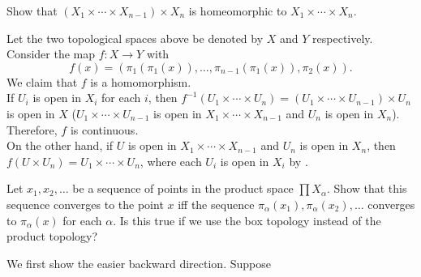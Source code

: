 	\setcounter{exercise}{3}
	\begin{exercise}
		Show that $(X_1\times \cdots\times X_{n-1})\times X_n$ is homeomorphic to $X_1\times\cdots\times X_n$.
	\end{exercise}
	\begin{solution*}
		Let the two topological spaces above be denoted by $X$ and $Y$ respectively. Consider the map $f:X\to Y$ with
		\[ f(x) = (\pi_1(\pi_1(x)), \ldots, \pi_{n-1}(\pi_1(x)), \pi_2(x)). \]
		We claim that $f$ is a homomorphism.\\
		If $U_i$ is open in $X_i$ for each $i$, then $f^{-1}(U_1\times\cdots\times U_n)=(U_1\times\cdots\times U_{n-1})\times U_n$ is open in $X$ ($U_1\times\cdots\times U_{n-1}$ is open in $X_1\times\cdots\times X_{n-1}$ and $U_n$ is open in $X_n$). Therefore, $f$ is continuous.\\
		On the other hand, if $U$ is open in $X_1\times\cdots\times X_{n-1}$ and $U_n$ is open in $X_n$, then $f(U\times U_n) = U_1\times\cdots\times U_n$, where each $U_i$ is open in $X_i$ by .
	\end{solution*}

	\setcounter{exercise}{5}
	\begin{exercise}
		Let $x_1,x_2,\ldots$ be a sequence of points in the product space $\prod X_\alpha$. Show that this sequence converges to the point $x$ iff the sequence $\pi_\alpha(x_1),\pi_\alpha(x_2),\ldots$ converges to $\pi_\alpha(x)$ for each $\alpha$. Is this true if we use the box topology instead of the product topology?
	\end{exercise}
	\begin{solution*}
		We first show the easier backward direction. Suppose 
	\end{solution*}	